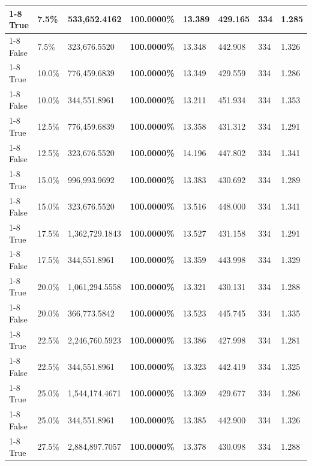 \begin{table}[H]
\begin{tabular}{lllrllll}
\cline{1-8}
True & 7.5\% & 533,652.4162 & \bfseries \color{red} 100.0000\% & 13.389 & 429.165 & 334 & 1.285 \\
\cline{1-8}
False & 7.5\% & 323,676.5520 & \bfseries \color{red} 100.0000\% & 13.348 & 442.908 & 334 & 1.326 \\
\cline{1-8}
True & 10.0\% & 776,459.6839 & \bfseries \color{red} 100.0000\% & 13.349 & 429.559 & 334 & 1.286 \\
\cline{1-8}
False & 10.0\% & 344,551.8961 & \bfseries \color{red} 100.0000\% & 13.211 & 451.934 & 334 & 1.353 \\
\cline{1-8}
True & 12.5\% & 776,459.6839 & \bfseries \color{red} 100.0000\% & 13.358 & 431.312 & 334 & 1.291 \\
\cline{1-8}
False & 12.5\% & 323,676.5520 & \bfseries \color{red} 100.0000\% & 14.196 & 447.802 & 334 & 1.341 \\
\cline{1-8}
True & 15.0\% & 996,993.9692 & \bfseries \color{red} 100.0000\% & 13.383 & 430.692 & 334 & 1.289 \\
\cline{1-8}
False & 15.0\% & 323,676.5520 & \bfseries \color{red} 100.0000\% & 13.516 & 448.000 & 334 & 1.341 \\
\cline{1-8}
True & 17.5\% & 1,362,729.1843 & \bfseries \color{red} 100.0000\% & 13.527 & 431.158 & 334 & 1.291 \\
\cline{1-8}
False & 17.5\% & 344,551.8961 & \bfseries \color{red} 100.0000\% & 13.359 & 443.998 & 334 & 1.329 \\
\cline{1-8}
True & 20.0\% & 1,061,294.5558 & \bfseries \color{red} 100.0000\% & 13.321 & 430.131 & 334 & 1.288 \\
\cline{1-8}
False & 20.0\% & 366,773.5842 & \bfseries \color{red} 100.0000\% & 13.523 & 445.745 & 334 & 1.335 \\
\cline{1-8}
True & 22.5\% & 2,246,760.5923 & \bfseries \color{red} 100.0000\% & 13.386 & 427.998 & 334 & 1.281 \\
\cline{1-8}
False & 22.5\% & 344,551.8961 & \bfseries \color{red} 100.0000\% & 13.323 & 442.419 & 334 & 1.325 \\
\cline{1-8}
True & 25.0\% & 1,544,174.4671 & \bfseries \color{red} 100.0000\% & 13.369 & 429.677 & 334 & 1.286 \\
\cline{1-8}
False & 25.0\% & 344,551.8961 & \bfseries \color{red} 100.0000\% & 13.385 & 442.900 & 334 & 1.326 \\
\cline{1-8}
True & 27.5\% & 2,884,897.7057 & \bfseries \color{red} 100.0000\% & 13.378 & 430.098 & 334 & 1.288 \\

\end{tabular}
\end{table}
